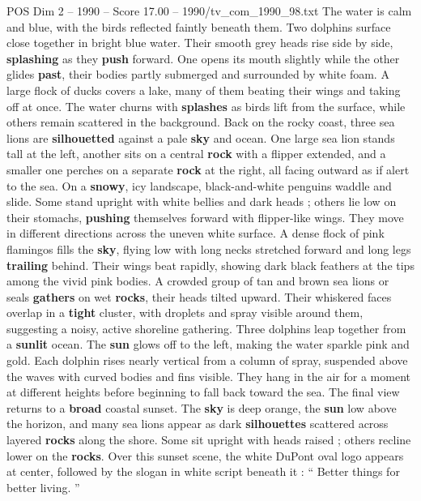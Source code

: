 \begin{textsample}{POS Dim 2 – 1990 – Score 17.00 – 1990/tv\_com\_1990\_98.txt}
The water is calm and blue, with the birds reflected faintly beneath them.
Two dolphins surface close together in bright blue water.
Their smooth grey heads rise side by side, \textbf{splashing} as they \textbf{push} forward.
One opens its mouth slightly while the other glides \textbf{past}, their bodies partly submerged and surrounded by white foam.
A large flock of ducks covers a lake, many of them beating their wings and taking off at once.
The water churns with \textbf{splashes} as birds lift from the surface, while others remain scattered in the background.
Back on the rocky coast, three sea lions are \textbf{silhouetted} against a pale \textbf{sky} and ocean.
One large sea lion stands tall at the left, another sits on a central \textbf{rock} with a flipper extended, and a smaller one perches on a separate \textbf{rock} at the right, all facing outward as if alert to the sea.
On a \textbf{snowy}, icy landscape, black-and-white penguins waddle and slide.
Some stand upright with white bellies and dark heads ; others lie low on their stomachs, \textbf{pushing} themselves forward with flipper-like wings.
They move in different directions across the uneven white surface.
A dense flock of pink flamingos fills the \textbf{sky}, flying low with long necks stretched forward and long legs \textbf{trailing} behind.
Their wings beat rapidly, showing dark black feathers at the tips among the vivid pink bodies.
A crowded group of tan and brown sea lions or seals \textbf{gathers} on wet \textbf{rocks}, their heads tilted upward.
Their whiskered faces overlap in a \textbf{tight} cluster, with droplets and spray visible around them, suggesting a noisy, active shoreline gathering.
Three dolphins leap together from a \textbf{sunlit} ocean.
The \textbf{sun} glows off to the left, making the water sparkle pink and gold.
Each dolphin rises nearly vertical from a column of spray, suspended above the waves with curved bodies and fins visible.
They hang in the air for a moment at different heights before beginning to fall back toward the sea.
The final view returns to a \textbf{broad} coastal sunset.
The \textbf{sky} is deep orange, the \textbf{sun} low above the horizon, and many sea lions appear as dark \textbf{silhouettes} scattered across layered \textbf{rocks} along the shore.
Some sit upright with heads raised ; others recline lower on the \textbf{rocks}.
Over this sunset scene, the white DuPont oval logo appears at center, followed by the slogan in white script beneath it : “ Better things for better living. ”

\end{textsample}
